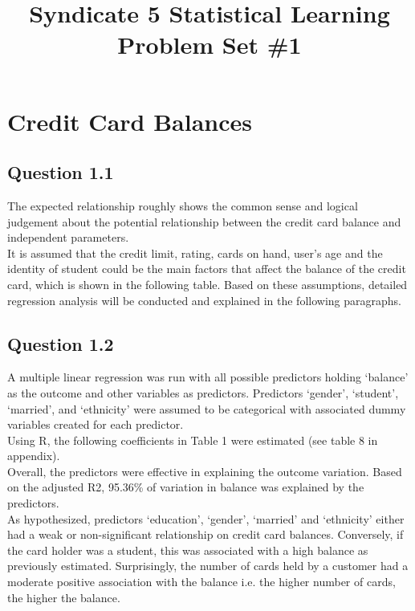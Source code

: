 \documentclass[11pt]{article}
\begin{document}
\title{Syndicate 5 Statistical Learning Problem Set \#1}
\maketitle
{}
{\setlength{\parindent}{0cm}



\section*{Credit Card Balances}
\subsection*{Question 1.1}
The expected relationship roughly shows the common sense and logical judgement about the potential relationship between the credit card balance and independent parameters.\\

It is assumed that the credit limit, rating, cards on hand, user’s age and the identity of student could be the main factors that affect the balance of the credit card, which is shown in the following table. Based on these assumptions, detailed regression analysis will be conducted and explained in the following paragraphs. 


\subsection*{Question 1.2}
A multiple linear regression was run with all possible predictors holding ‘balance’ as the outcome and other variables as predictors. Predictors ‘gender’, ‘student’, ‘married’, and ‘ethnicity’ were assumed to be categorical with associated dummy variables created for each predictor.\\ 

Using R, the following coefficients in Table 1 were estimated (see table 8 in appendix).\\
 
Overall, the predictors were effective in explaining the outcome variation. Based on the adjusted R2, 95.36\% of variation in balance was explained by the predictors.\\

As hypothesized, predictors ‘education’, ‘gender’, ‘married’ and ‘ethnicity’ either had a weak or non-significant relationship on credit card balances. Conversely, if the card holder was a student, this was associated with a high balance as previously estimated. Surprisingly, the number of cards held by a customer had a moderate positive association with the balance i.e. the higher number of cards, the higher the balance.

}
\end{document}
